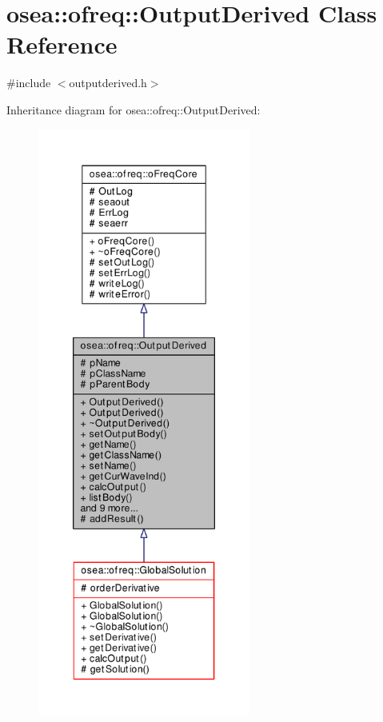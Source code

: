 \hypertarget{classosea_1_1ofreq_1_1_output_derived}{\section{osea\-:\-:ofreq\-:\-:Output\-Derived Class Reference}
\label{classosea_1_1ofreq_1_1_output_derived}
}


{\ttfamily \#include $<$outputderived.\-h$>$}



Inheritance diagram for osea\-:\-:ofreq\-:\-:Output\-Derived\-:\nopagebreak
\begin{figure}[H]
\begin{center}
\leavevmode
\includegraphics[height=550pt]{classosea_1_1ofreq_1_1_output_derived__inherit__graph}
\end{center}
\end{figure}
